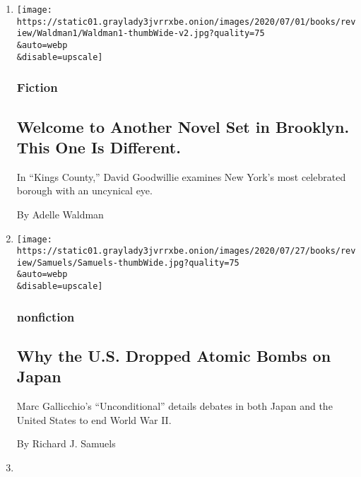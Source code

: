 \begin{enumerate}
\def\labelenumi{\arabic{enumi}.}
\item
  \href{/2020/08/03/books/review/kings-county-david-goodwillie.html}{}

  \texttt{[image: https://static01.graylady3jvrrxbe.onion/images/2020/07/01/books/review/Waldman1/Waldman1-thumbWide-v2.jpg?quality=75\\\&auto=webp\\\&disable=upscale]}

  \hypertarget{fiction}{%
  \subsubsection{Fiction}\label{fiction}}

  \hypertarget{welcome-to-another-novel-set-in-brooklyn-this-one-is-different}{%
  \subsection{Welcome to Another Novel Set in Brooklyn. This One Is
  Different.}\label{welcome-to-another-novel-set-in-brooklyn-this-one-is-different}}

  In ``Kings County,'' David Goodwillie examines New York's most
  celebrated borough with an uncynical eye.

  By Adelle Waldman
\item
  \href{/2020/08/03/books/review/unconditional-marc-gallicchio.html}{}

  \texttt{[image: https://static01.graylady3jvrrxbe.onion/images/2020/07/27/books/review/Samuels/Samuels-thumbWide.jpg?quality=75\\\&auto=webp\\\&disable=upscale]}

  \hypertarget{nonfiction}{%
  \subsubsection{nonfiction}\label{nonfiction}}

  \hypertarget{why-the-us-dropped-atomic-bombs-on-japan}{%
  \subsection{Why the U.S. Dropped Atomic Bombs on
  Japan}\label{why-the-us-dropped-atomic-bombs-on-japan}}

  Marc Gallicchio's ``Unconditional'' details debates in both Japan and
  the United States to end World War II.

  By Richard J. Samuels
\item
  \href{/2020/08/03/books/review/wandering-in-strange-lands-morgan-jerkins.html}{}


\end{enumerate}
